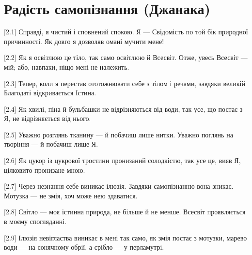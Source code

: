 \chapter[Джанака]{Радість самопізнання (Джанака)}

[2.1] Справді, я чистий і сповнений спокою. Я --- Свідомість по той бік природної причинності. Як довго я дозволяв омані мучити мене!

[2.2] Як я освітлюю це тіло, так само освітлюю й Всесвіт. Отже, увесь Всесвіт --- мій; або, навпаки, ніщо мені не належить.

[2.3] Тепер, коли я перестав ототожнювати себе з тілом і речами, завдяки великій Благодаті відкривається Істина.

[2.4] Як хвилі, піна й бульбашки не відрізняються від води, так усе, що постає з Я, не відрізняється від нього.

[2.5] Уважно розглянь тканину --- й побачиш лише нитки. Уважно поглянь на творіння --- й побачиш лише Я.

[2.6] Як цукор із цукрової тростини пронизаний солодкістю, так усе це, вияв Я, цілковито пронизане мною.

[2.7] Через незнання себе виникає ілюзія. Завдяки самопізнанню вона зникає. Мотузка --- не змія, хоч може нею здаватися.

[2.8] Світло --- моя істинна природа, не більше й не менше. Всесвіт проявляється в моєму спогляданні.

[2.9] Ілюзія невігластва виникає в мені так само, як змія постає з мотузки, марево води --- на сонячному обрії, а срібло --- у перламутрі.
